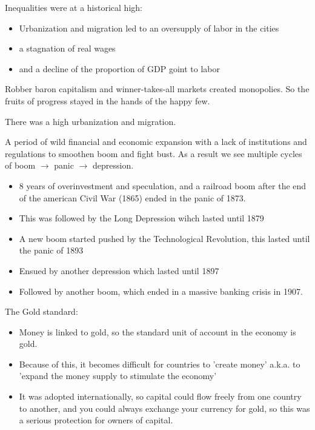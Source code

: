 Inequalities were at a historical high:
\begin{itemize}
    \item Urbanization and migration led to an oversupply of labor in the
        cities
    \item a stagnation of real wages
    \item and a decline of the proportion of GDP goint to labor
\end{itemize}
Robber baron capitalism and winner-takes-all markets created monopolies.
So the fruits of progress stayed in the hands of the happy few.

\vspace{1\baselineskip}

There was a high urbanization and migration.

\vspace{1\baselineskip}

A period of wild financial and economic expansion with a lack of
institutions and regulations to smoothen boom and fight bust. As a result
we see multiple cycles of boom $\rightarrow$ panic $\rightarrow$ depression.

\begin{itemize}
    \item $8$ years of overinvestment and speculation, and a railroad
        boom after the end of the american Civil War (1865) ended in the
        panic of 1873.
    \item This was followed by the Long Depression wihch lasted until 1879
    \item A new boom started pushed by the Technological Revolution, this
        lasted until the panic of 1893
    \item Ensued by another depression which lasted until 1897
    \item Followed by another boom, which ended in a massive banking crisis
        in 1907. 
\end{itemize}

The Gold standard:
\begin{itemize}
    \item Money is linked to gold, so the standard unit of account in the
        economy is gold.
    \item Because of this, it becomes difficult for countries to 'create
        money' a.k.a. to 'expand the money supply to stimulate the economy'
    \item It was adopted internationally, so capital could flow freely from
        one country to another, and you could always exchange your currency
        for gold, so this was a serious protection for owners of capital.
\end{itemize}

